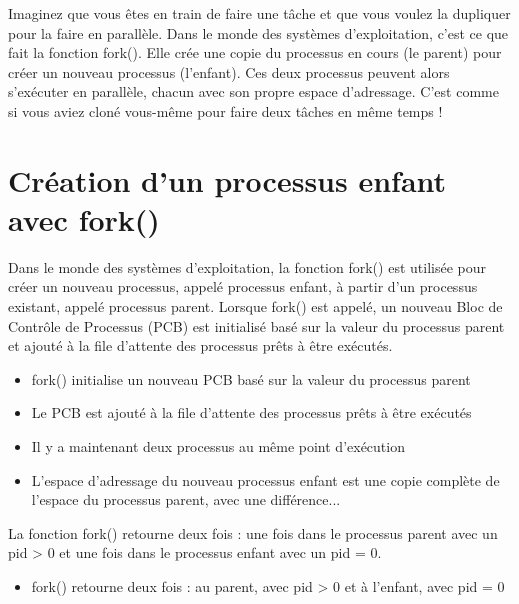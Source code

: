 \documentclass[12pt]{report}
\begin{document}
\begin{tcolorbox}[colback=blue!10,colframe=blue,title={\fontfamily{lmr}\selectfont \\faComment\ Vulgarisation simple},fonttitle=\bfseries,fontupper=\fontfamily{lmr}\selectfont,boxrule=1pt,sharp corners] 
Imaginez que vous êtes en train de faire une tâche et que vous voulez la dupliquer pour la faire en parallèle. Dans le monde des systèmes d'exploitation, c'est ce que fait la fonction fork(). Elle crée une copie du processus en cours (le parent) pour créer un nouveau processus (l'enfant). Ces deux processus peuvent alors s'exécuter en parallèle, chacun avec son propre espace d'adressage. C'est comme si vous aviez cloné vous-même pour faire deux tâches en même temps ! 
\end{tcolorbox}
\section{Création d'un processus enfant avec fork()} 

Dans le monde des systèmes d'exploitation, la fonction fork() est utilisée pour créer un nouveau processus, appelé processus enfant, à partir d'un processus existant, appelé processus parent. Lorsque fork() est appelé, un nouveau Bloc de Contrôle de Processus (PCB) est initialisé basé sur la valeur du processus parent et ajouté à la file d'attente des processus prêts à être exécutés. 

\begin{itemize} 
\item fork() initialise un nouveau PCB basé sur la valeur du processus parent 
\item Le PCB est ajouté à la file d'attente des processus prêts à être exécutés 
\item Il y a maintenant deux processus au même point d'exécution 
\item L'espace d'adressage du nouveau processus enfant est une copie complète de l'espace du processus parent, avec une différence... 
\end{itemize} 

La fonction fork() retourne deux fois : une fois dans le processus parent avec un pid > 0 et une fois dans le processus enfant avec un pid = 0. 

\begin{itemize} 
\item fork() retourne deux fois : au parent, avec pid > 0 et à l'enfant, avec pid = 0 
\end{itemize} 
\end{document}
